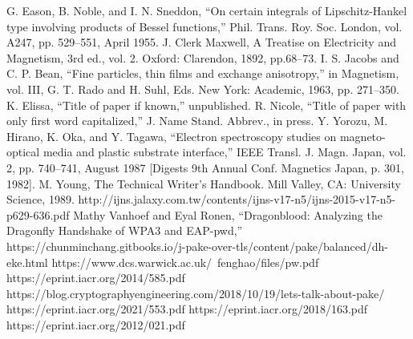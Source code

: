 \documentclass[journal]{IEEEtran}
\begin{document}



\begin{thebibliography}{00}
 G. Eason, B. Noble, and I. N. Sneddon, ``On certain integrals of Lipschitz-Hankel type involving products of Bessel functions,'' Phil. Trans. Roy. Soc. London, vol. A247, pp. 529--551, April 1955.
 J. Clerk Maxwell, A Treatise on Electricity and Magnetism, 3rd ed., vol. 2. Oxford: Clarendon, 1892, pp.68--73.
 I. S. Jacobs and C. P. Bean, ``Fine particles, thin films and exchange anisotropy,'' in Magnetism, vol. III, G. T. Rado and H. Suhl, Eds. New York: Academic, 1963, pp. 271--350.
 K. Elissa, ``Title of paper if known,'' unpublished.
 R. Nicole, ``Title of paper with only first word capitalized,'' J. Name Stand. Abbrev., in press.
 Y. Yorozu, M. Hirano, K. Oka, and Y. Tagawa, ``Electron spectroscopy studies on magneto-optical media and plastic substrate interface,'' IEEE Transl. J. Magn. Japan, vol. 2, pp. 740--741, August 1987 [Digests 9th Annual Conf. Magnetics Japan, p. 301, 1982].
 M. Young, The Technical Writer's Handbook. Mill Valley, CA: University Science, 1989.
 http://ijns.jalaxy.com.tw/contents/ijns-v17-n5/ijns-2015-v17-n5-p629-636.pdf
 Mathy Vanhoef and Eyal Ronen, ``Dragonblood: Analyzing the Dragonfly Handshake of WPA3 and EAP-pwd,''
 https://chunminchang.gitbooks.io/j-pake-over-tls/content/pake/balanced/dh-eke.html
 https://www.dcs.warwick.ac.uk/~fenghao/files/pw.pdf
 https://eprint.iacr.org/2014/585.pdf
 https://blog.cryptographyengineering.com/2018/10/19/lets-talk-about-pake/
 https://eprint.iacr.org/2021/553.pdf
 https://eprint.iacr.org/2018/163.pdf
 https://eprint.iacr.org/2012/021.pdf
\end{thebibliography}
\vspace{12pt}
\end{document}
